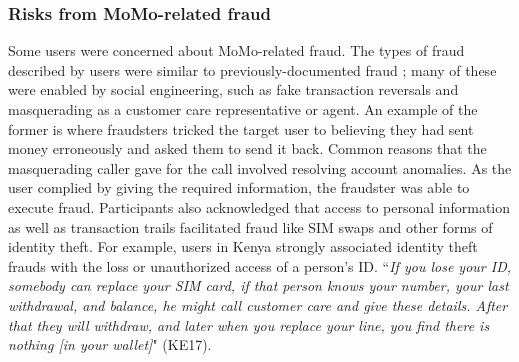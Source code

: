 \subsubsection{Risks from MoMo-related fraud}
\label{sec:fraud}
Some users were concerned about MoMo-related fraud. The types of fraud described by users  were similar to previously-documented fraud \cite{buku2017fraud} \cite{akomea2019control}; many of these were enabled by  social engineering, such as fake transaction reversals and masquerading as a customer care representative or agent. An example of the former is where fraudsters tricked the target user to believing they had sent money erroneously and asked them to send it back. Common reasons that the masquerading caller gave for the call involved resolving account anomalies. As the user complied by giving the required information, the fraudster was able to execute fraud. 
Participants also acknowledged that access to personal information as well as transaction trails facilitated fraud like SIM swaps and other forms of identity theft. For example, users in Kenya strongly associated identity theft frauds with the loss or unauthorized access of a person's ID. ``\textit{If you lose your ID, somebody can replace your SIM card, if that person knows your number, your last withdrawal, and balance, he might call customer care and give these details. After that they will withdraw, and later when you replace your line, you find there is nothing [in your wallet]}" (KE17). 
